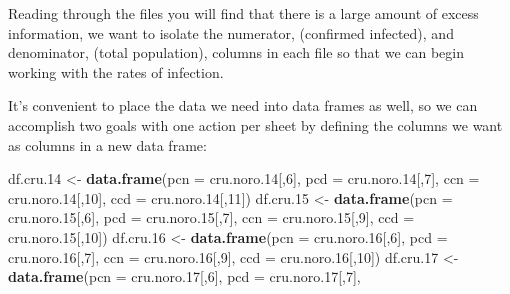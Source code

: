 \documentclass[
  11,
]{book}
\newenvironment{Shaded}{\begin{snugshade}}{\end{snugshade}}
\newcommand{\AttributeTok}[1]{\textcolor[rgb]{0.27,0.27,0.27}{#1}}
\newcommand{\DecValTok}[1]{\textcolor[rgb]{0.06,0.06,0.06}{#1}}
\newcommand{\FloatTok}[1]{\textcolor[rgb]{0.06,0.06,0.06}{#1}}
\newcommand{\FunctionTok}[1]{\textcolor[rgb]{0.27,0.27,0.27}{\textbf{#1}}}
\newcommand{\NormalTok}[1]{#1}
\newcommand{\OtherTok}[1]{\textcolor[rgb]{0.37,0.37,0.37}{#1}}
\begin{document}
Reading through the files you will find that there is a large amount of excess information, we want to isolate the numerator, (confirmed infected), and denominator, (total population), columns in each file so that we can begin working with the rates of infection.

It's convenient to place the data we need into data frames as well, so we can accomplish two goals with one action per sheet by defining the columns we want as columns in a new data frame:

\begin{Shaded}
\begin{Highlighting}[]
\NormalTok{df.cru}\FloatTok{.14} \OtherTok{\textless{}{-}} \FunctionTok{data.frame}\NormalTok{(}\AttributeTok{pcn =}\NormalTok{ cru.noro}\FloatTok{.14}\NormalTok{[,}\DecValTok{6}\NormalTok{],}
                        \AttributeTok{pcd =}\NormalTok{ cru.noro}\FloatTok{.14}\NormalTok{[,}\DecValTok{7}\NormalTok{],}
                        \AttributeTok{ccn =}\NormalTok{ cru.noro}\FloatTok{.14}\NormalTok{[,}\DecValTok{10}\NormalTok{],}
                        \AttributeTok{ccd =}\NormalTok{ cru.noro}\FloatTok{.14}\NormalTok{[,}\DecValTok{11}\NormalTok{])}
\NormalTok{df.cru}\FloatTok{.15} \OtherTok{\textless{}{-}} \FunctionTok{data.frame}\NormalTok{(}\AttributeTok{pcn =}\NormalTok{ cru.noro}\FloatTok{.15}\NormalTok{[,}\DecValTok{6}\NormalTok{],}
                          \AttributeTok{pcd =}\NormalTok{ cru.noro}\FloatTok{.15}\NormalTok{[,}\DecValTok{7}\NormalTok{],}
                          \AttributeTok{ccn =}\NormalTok{ cru.noro}\FloatTok{.15}\NormalTok{[,}\DecValTok{9}\NormalTok{],}
                          \AttributeTok{ccd =}\NormalTok{ cru.noro}\FloatTok{.15}\NormalTok{[,}\DecValTok{10}\NormalTok{])}
\NormalTok{df.cru}\FloatTok{.16} \OtherTok{\textless{}{-}} \FunctionTok{data.frame}\NormalTok{(}\AttributeTok{pcn =}\NormalTok{ cru.noro}\FloatTok{.16}\NormalTok{[,}\DecValTok{6}\NormalTok{],}
                        \AttributeTok{pcd =}\NormalTok{ cru.noro}\FloatTok{.16}\NormalTok{[,}\DecValTok{7}\NormalTok{],}
                        \AttributeTok{ccn =}\NormalTok{ cru.noro}\FloatTok{.16}\NormalTok{[,}\DecValTok{9}\NormalTok{],}
                        \AttributeTok{ccd =}\NormalTok{ cru.noro}\FloatTok{.16}\NormalTok{[,}\DecValTok{10}\NormalTok{])}
\NormalTok{df.cru}\FloatTok{.17} \OtherTok{\textless{}{-}} \FunctionTok{data.frame}\NormalTok{(}\AttributeTok{pcn =}\NormalTok{ cru.noro}\FloatTok{.17}\NormalTok{[,}\DecValTok{6}\NormalTok{],}
                        \AttributeTok{pcd =}\NormalTok{ cru.noro}\FloatTok{.17}\NormalTok{[,}\DecValTok{7}\NormalTok{],}

\end{Highlighting}
\end{Shaded}
\end{document}
